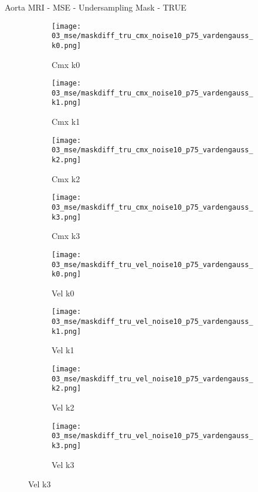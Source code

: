 \documentclass{beamer}
\begin{document}
\begin{frame}{Aorta MRI - MSE - Undersampling Mask - TRUE}{}
\begin{figure}
\begin{subfigure}{0.24\textwidth}
\texttt{[image: 03\_mse/maskdiff\_tru\_cmx\_noise10\_p75\_vardengauss\_k0.png]}
\vspace{-20pt}
\caption*{\tiny Cmx k0}
\end{subfigure}
\begin{subfigure}{0.24\textwidth}
\texttt{[image: 03\_mse/maskdiff\_tru\_cmx\_noise10\_p75\_vardengauss\_k1.png]}
\vspace{-20pt}
\caption*{\tiny Cmx k1}
\end{subfigure}
\begin{subfigure}{0.24\textwidth}
\texttt{[image: 03\_mse/maskdiff\_tru\_cmx\_noise10\_p75\_vardengauss\_k2.png]}
\vspace{-20pt}
\caption*{\tiny Cmx k2}
\end{subfigure}
\begin{subfigure}{0.24\textwidth}
\texttt{[image: 03\_mse/maskdiff\_tru\_cmx\_noise10\_p75\_vardengauss\_k3.png]}
\vspace{-20pt}
\caption*{\tiny Cmx k3}
\end{subfigure}

\begin{subfigure}{0.24\textwidth}
\texttt{[image: 03\_mse/maskdiff\_tru\_vel\_noise10\_p75\_vardengauss\_k0.png]}
\vspace{-20pt}
\caption*{\tiny Vel k0}
\end{subfigure}
\begin{subfigure}{0.24\textwidth}
\texttt{[image: 03\_mse/maskdiff\_tru\_vel\_noise10\_p75\_vardengauss\_k1.png]}
\vspace{-20pt}
\caption*{\tiny Vel k1}
\end{subfigure}
\begin{subfigure}{0.24\textwidth}
\texttt{[image: 03\_mse/maskdiff\_tru\_vel\_noise10\_p75\_vardengauss\_k2.png]}
\vspace{-20pt}
\caption*{\tiny Vel k2}
\end{subfigure}
\begin{subfigure}{0.24\textwidth}
\texttt{[image: 03\_mse/maskdiff\_tru\_vel\_noise10\_p75\_vardengauss\_k3.png]}
\vspace{-20pt}
\caption*{\tiny Vel k3}
\end{subfigure}
\end{figure}
\end{frame}
\end{document}
